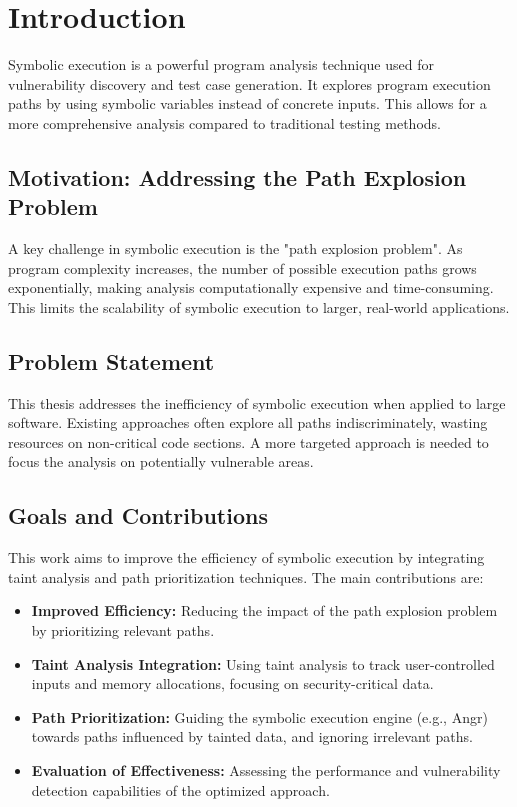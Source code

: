 \chapter{Introduction}

Symbolic execution is a powerful program analysis technique used for vulnerability discovery and test case generation. It explores program execution paths by using symbolic variables instead of concrete inputs. This allows for a more comprehensive analysis compared to traditional testing methods.

\section{Motivation: Addressing the Path Explosion Problem}

A key challenge in symbolic execution is the "path explosion problem". As program complexity increases, the number of possible execution paths grows exponentially, making analysis computationally expensive and time-consuming. This limits the scalability of symbolic execution to larger, real-world applications.

\section{Problem Statement}

This thesis addresses the inefficiency of symbolic execution when applied to large software. Existing approaches often explore all paths indiscriminately, wasting resources on non-critical code sections. A more targeted approach is needed to focus the analysis on potentially vulnerable areas.

\section{Goals and Contributions}

This work aims to improve the efficiency of symbolic execution by integrating taint analysis and path prioritization techniques. The main contributions are:

\begin{itemize}
    \item \textbf{Improved Efficiency:} Reducing the impact of the path explosion problem by prioritizing relevant paths.
    \item \textbf{Taint Analysis Integration:} Using taint analysis to track user-controlled inputs and memory allocations, focusing on security-critical data.
    \item \textbf{Path Prioritization:} Guiding the symbolic execution engine (e.g., Angr) towards paths influenced by tainted data, and ignoring irrelevant paths.
    \item \textbf{Evaluation of Effectiveness:} Assessing the performance and vulnerability detection capabilities of the optimized approach.
\end{itemize}

